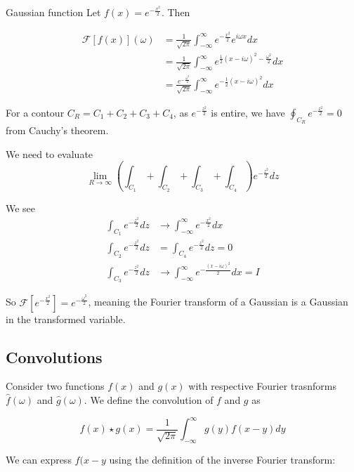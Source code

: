 \documentclass{physics_notes}
\newcommand{\intfty}{\int_{-\infty}^\infty}
\begin{document}
\begin{example}{Gaussian function}
Let $f(x) = e^{-\frac{x^2}{2}}$. Then

\begin{align*}
\mathcal{F}\left[f(x)\right](\omega) &= \frac{1}{\sqrt{2\pi}}\int_{-\infty}^\infty e^{-\frac{x^2}{2}} e^{i\omega x} dx \\
&= \frac{1}{\sqrt{2\pi}}\int_{-\infty}^\infty e^{\frac{1}{2}(x - i\omega)^2 - \frac{\omega^2}{2}} dx \\
&= \frac{e^{-\frac{\omega^2}{2}}}{\sqrt{2\pi}}\int_{-\infty}^\infty e^{-\frac{1}{2}(x - i\omega)^2} dx
\end{align*}

For a contour $C_R = C_1 + C_2 + C_3 + C_4$, as $e^{-\frac{z^2}{2}}$ is entire, we have $\oint_{C_R} e^{-\frac{z^2}{2}} = 0$ from Cauchy's theorem.

We need to evaluate 
\[ \lim_{R\to\infty} \left(\int_{C_1} + \int_{C_2} + \int_{C_3} + \int_{C_4}\right)e^{-\frac{z^2}{2}}dz\]

We see 
\begin{align*}
\int_{C_1} e^{-\frac{z^2}{2}} dz &\to \int_{-\infty}^\infty e^{-\frac{x^2}{2}} dx \\
\int_{C_2} e^{-\frac{z^2}{2}} dz &= \int_{C_4} e^{-\frac{z^2}{2}} dz  = 0 \\
\int_{C_3} e^{-\frac{z^2}{2}} dz &\to \int_{-\infty}^\infty e^{-\frac{(x-i\omega)^2}{2}} dx = I
\end{align*}

So $\mathcal{F}\left[e^{-\frac{x^2}{2}}\right] = e^{-\frac{\omega^2}{2}}$, meaning the Fourier transform of a Gaussian is a Gaussian in the transformed variable.
\end{example}

\subsection{Convolutions}

Consider two functions $f(x)$ and $g(x)$ with respective Fourier trasnforms $\hat{f}(\omega)$ and $\hat{g}(\omega)$. We define the convolution of $f$ and $g$ as 

\begin{equation}\label{eq:f_convolution}
f(x) \star g(x) = \frac{1}{\sqrt{2\pi}}\intfty g(y)f(x-y)dy
\end{equation}

We can express $f(x-y$ using the definition of the inverse Fourier transform:
\end{document}
